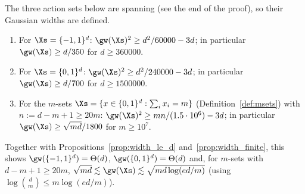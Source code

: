 \begin{corollary}\label{cor:width_structured}
The three action sets below are spanning (see the end of the proof), so their Gaussian
widths are defined.
\begin{enumerate}
  \item[(i)] For $\Xs = \{-1,1\}^d$: $\gw(\Xs)^2 \ge d^2/60000 - 3d$; in particular
        $\gw(\Xs) \ge d/350$ for $d \ge 360000$.
  \item[(ii)] For $\Xs = \{0,1\}^d$: $\gw(\Xs)^2 \ge d^2/240000 - 3d$; in particular
        $\gw(\Xs) \ge d/700$ for $d \ge 1500000$.
  \item[(iii)] For the $m$-sets $\Xs = \{x \in \{0,1\}^d : \sum_i x_i = m\}$
        (Definition~\ref{def:msets}) with $n := d - m + 1 \ge 20m$:
        $\gw(\Xs)^2 \ge mn/(1.5\cdot 10^6) - 3d$; in particular
        $\gw(\Xs) \ge \sqrt{md}/1800$ for $m \ge 10^7$.
\end{enumerate}
Together with Propositions~\ref{prop:width_le_d} and~\ref{prop:width_finite}, this shows
$\gw(\{-1,1\}^d) = \Theta(d)$, $\gw(\{0,1\}^d) = \Theta(d)$ and, for $m$-sets with
$d - m + 1 \ge 20m$, $\sqrt{md} \lesssim \gw(\Xs) \lesssim \sqrt{md\log(ed/m)}$
(using $\log\binom{d}{m} \le m\log(ed/m)$).
\end{corollary}

